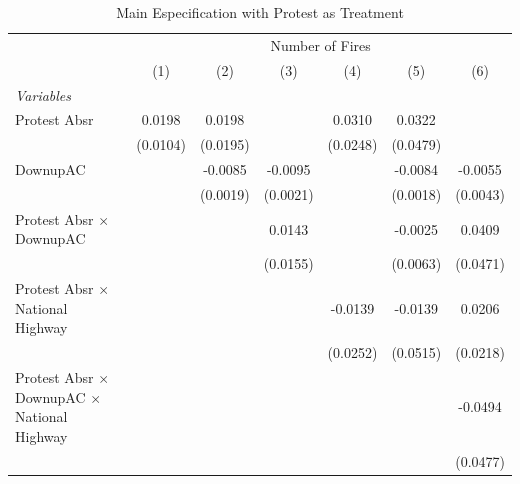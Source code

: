 
\begin{table}[htbp]
   \caption{\label{tab:protest_treat_main} Main Especification with Protest as Treatment}
   \centering
   \begin{tabular}{lcccccc}
      \tabularnewline \midrule \midrule
       & \multicolumn{6}{c}{Number of Fires}\\
                                                                 & (1)           & (2)           & (3)           & (4)           & (5)           & (6)\\  
      \midrule
      \emph{Variables}\\
      Protest Absr                                               & 0.0198        & 0.0198        &               & 0.0310        & 0.0322        &   \\   
                                                                 & (0.0104)      & (0.0195)      &               & (0.0248)      & (0.0479)      &   \\   
      DownupAC                                                   &               & -0.0085       & -0.0095       &               & -0.0084       & -0.0055\\   
                                                                 &               & (0.0019)      & (0.0021)      &               & (0.0018)      & (0.0043)\\   
      Protest Absr $\times$ DownupAC                             &               &               & 0.0143        &               & -0.0025       & 0.0409\\   
                                                                 &               &               & (0.0155)      &               & (0.0063)      & (0.0471)\\   
      Protest Absr $\times$ National Highway                     &               &               &               & -0.0139       & -0.0139       & 0.0206\\   
                                                                 &               &               &               & (0.0252)      & (0.0515)      & (0.0218)\\   
      Protest Absr $\times$ DownupAC $\times$ National Highway   &               &               &               &               &               & -0.0494\\   
                                                                 &               &               &               &               &               & (0.0477)\\   

\end{tabular}
\end{table}
